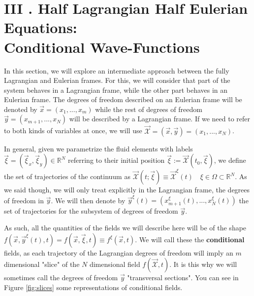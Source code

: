 \documentclass[11pt, a4paper]{article} %
\newcommand{\R}{\mathbb{R}} %
\newcommand{\x}{\mathcal{X}}
\begin{document}
\section*{III . Half Lagrangian Half Eulerian Equations:\\ Conditional Wave-Functions}
In this section, we will explore an intermediate approach between the fully Lagrangian and Eulerian frames. For this, we will consider that part of the system behaves in a Lagrangian frame, while the other part behaves in an Eulerian frame. The degrees of freedom described on an Eulerian frame will be denoted by $\vec{x}=(x_1,...,x_m)$ while the rest of degrees of freedom $\vec{y}=(x_{m+1},...,x_N)$ will be described by a Lagrangian frame. If we need to refer to both kinds of variables at once, we will use $\vec{\x}=(\vec{x}, \vec{y})=(x_1,...,x_N)$.

In general, given we parametrize the fluid elements with labels $\vec{\xi}=(\vec{\xi}_x,\vec{\xi}_y)\in\R^N$ referring to their initial position $\vec{\xi}:=\vec{\x}(t_0, \vec{\xi})$, we define the set of trajectories of the continuum as $\vec{\x}(t;\vec{\xi}) \equiv \vec{\x}^\xi(t) \quad \xi \in \Omega \subset \R^N$. As we said though, we will only treat explicitly in the Lagrangian frame, the degrees of freedom in $\vec{y}$. We will then denote by $\vec{y}^\xi(t)=(x_{m+1}^\xi(t),...,x_N^\xi(t))$ the set of trajectories for the subsystem of degrees of freedom $\vec{y}$.

As such, all the quantities of the fields we will describe here will be of the shape $f(\vec{x}, \vec{y}^\xi(t),t)=f(\vec{x}, \vec{\xi},t)\equiv f^\xi(\vec{x},t)$. We will call these the {\bf conditional} fields, as each trajectory of the Lagrangian degrees of freedom will imply an $m$ dimensional "slice" of the $N$ dimensional field $f(\vec{\x},t)$. It is this why we will sometimes call the degrees of freedom $\vec{y}$ "transversal sections". You can see in Figure \ref{fig:slices} some representations of conditional fields.
\end{document}

